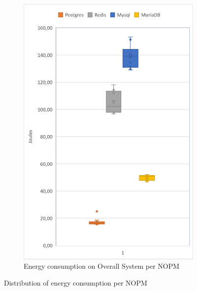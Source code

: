 \begin{figure}[!ht]
\begin{subfigure}[b]{0.32\textwidth}
                \includegraphics[width=1\columnwidth]{results/boxplot/10m/total-nopm.png}
            \caption[]%
            {{\small Energy consumption on Overall System per NOPM}}    
            \label{fig:bocplotnopmtotal10m}
        \end{subfigure}
        \caption[ Distribution of energy consumption per NOPM ]
        {\small Distribution of energy consumption per NOPM} 
        \label{fig:bocplotnumber10m}
    \end{figure}